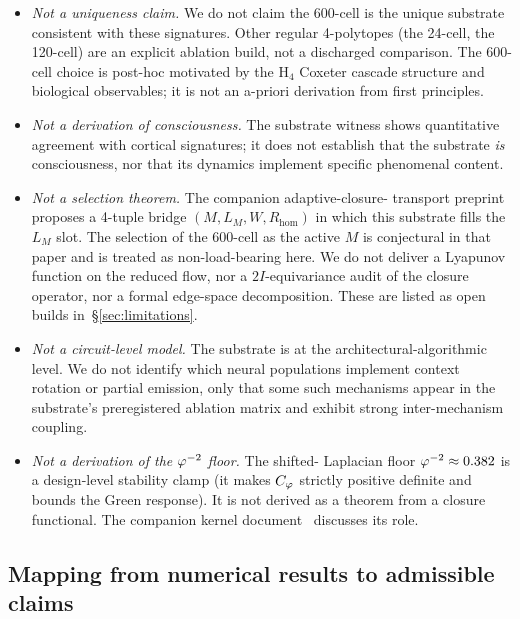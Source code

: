 \begin{itemize}\itemsep=2pt
\item \emph{Not a uniqueness claim.} We do not claim the 600-cell is
  the unique substrate consistent with these signatures. Other regular
  4-polytopes (the 24-cell, the 120-cell) are an explicit ablation
  build, not a discharged comparison. The 600-cell choice is post-hoc
  motivated by the H$_4$ Coxeter cascade structure and biological
  observables; it is not an a-priori derivation from first principles.
\item \emph{Not a derivation of consciousness.} The substrate witness
  shows quantitative agreement with cortical signatures; it does not
  establish that the substrate \emph{is} consciousness, nor that
  its dynamics implement specific phenomenal content.
\item \emph{Not a selection theorem.} The companion adaptive-closure-
  transport preprint~\citep{SmartAdaptiveClosureTransport2026}
  proposes a 4-tuple bridge $(M, L_M, W, R_{\mathrm{hom}})$ in which
  this substrate fills the $L_M$ slot. The selection of the 600-cell
  as the active $M$ is conjectural in that paper and is treated as
  non-load-bearing here. We do not deliver a Lyapunov function on the
  reduced flow, nor a $2I$-equivariance audit of the closure operator,
  nor a formal edge-space decomposition. These are listed as open
  builds in~\S\ref{sec:limitations}.
\item \emph{Not a circuit-level model.} The substrate is at the
  architectural-algorithmic level. We do not identify which neural
  populations implement context rotation or partial emission, only
  that some such mechanisms appear in the substrate's preregistered
  ablation matrix and exhibit strong inter-mechanism coupling.
\item \emph{Not a derivation of the $\varphi^{-2}$ floor.} The shifted-
  Laplacian floor $\varphi^{-2} \approx 0.382$ is a design-level
  stability clamp (it makes $C_{\varphi}$ strictly positive definite and
  bounds the Green response). It is not derived as a theorem from a
  closure functional. The companion kernel
  document~\citep{SmartAriaClosureKernel2026} discusses its role.
\end{itemize}

\subsection*{Mapping from numerical results to admissible claims}

